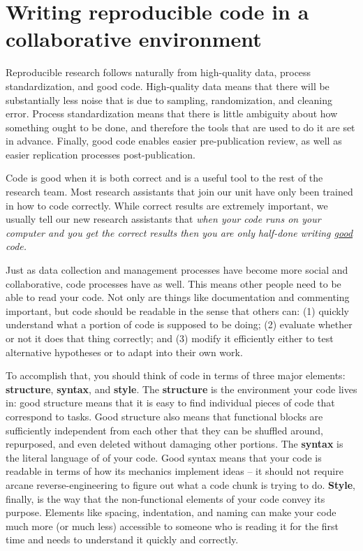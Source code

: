 \section{Writing reproducible code in a collaborative environment}

Reproducible research follows naturally from
high-quality data, process standardization, and good code.
High-quality data means that there will be substantially less noise
that is due to sampling, randomization, and cleaning error.
Process standardization means that there is
little ambiguity about how something ought to be done,
and therefore the tools that are used to do it are set in advance.
Finally, good code enables easier pre-publication review,
as well as easier replication processes post-publication.

Code is good when it is both correct and is a useful tool to the rest of the research team. Most research assistants that join our unit have only been trained in how to code correctly. While correct results are extremely important, we usually tell our new research assistants that \textit{when your code runs on your computer and you get the correct results then you are only half-done writing \underline{good} code.} 

Just as data collection and management processes have become more social and collaborative,
code processes have as well. This means other people need to be able to read your code.
Not only are things like documentation and commenting important,
but code should be readable in the sense that others can:
(1) quickly understand what a portion of code is supposed to be doing;
(2) evaluate whether or not it does that thing correctly; and
(3) modify it efficiently either to test alternative hypotheses
or to adapt into their own work.

To accomplish that, you should think of code in terms of three major elements:
\textbf{structure}, \textbf{syntax}, and \textbf{style}.
The \textbf{structure} is the environment your code lives in:
good structure means that it is easy to find individual pieces of code that correspond to tasks.
Good structure also means that functional blocks are sufficiently independent from each other
that they can be shuffled around, repurposed, and even deleted without damaging other portions.
The \textbf{syntax} is the literal language of of your code.
Good syntax means that your code is readable
in terms of how its mechanics implement ideas --
it should not require arcane reverse-engineering
to figure out what a code chunk is trying to do.
\textbf{Style}, finally, is the way that the non-functional elements of your code convey its purpose.
Elements like spacing, indentation, and naming can make your code much more (or much less)
accessible to someone who is reading it for the first time and needs to understand it quickly and correctly.

